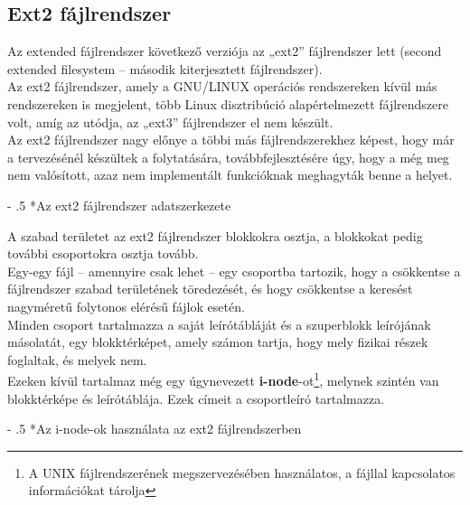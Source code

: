 \documentclass[tikz,12pt,margin=0px]{article}
\makeatletter
\renewcommand\paragraph{%
	\@startsection{paragraph}{4}{0mm}%
	{-\baselineskip}%
	{.5\baselineskip}%
	{\normalfont\normalsize\bfseries}}
\makeatother
\begin{document}
    \subsection*{Ext2 fájlrendszer}

    \noindent Az extended fájlrendszer következő verziója az „ext2” fájlrendszer lett (second extended filesystem – második kiterjesztett fájlrendszer).\\

    \noindent Az ext2 fájlrendszer, amely a GNU/LINUX operációs rendszereken kívül más rendszereken is megjelent, több Linux disztribúció alapértelmezett fájlrendszere volt, amíg az utódja, az „ext3” fájlrendszer  el nem készült.\\

    \noindent Az ext2 fájlrendszer nagy előnye a többi más fájlrendszerekhez képest, hogy már a tervezésénél készültek a folytatására, továbbfejlesztésére úgy, hogy a még meg nem valósított, azaz nem implementált funkcióknak meghagyták benne a helyet.

    \paragraph*{Az ext2 fájlrendszer adatszerkezete}

    \noindent A szabad területet az ext2 fájlrendszer blokkokra osztja, a blokkokat pedig további csoportokra osztja tovább. \\

    \noindent Egy-egy fájl – amennyire csak lehet – egy csoportba tartozik, hogy a csökkentse a fájlrendszer szabad területének töredezését, és hogy csökkentse a keresést nagyméretű folytonos elérésű fájlok esetén.\\

    \noindent Minden csoport tartalmazza a saját leírótábláját és a szuperblokk leírójának másolatát, egy blokktérképet, amely számon tartja, hogy mely fizikai részek foglaltak, és melyek nem.\\

    \noindent Ezeken kívül tartalmaz még egy úgynevezett \textbf{i-node}-ot\footnote{A UNIX fájlrendszerének megszervezésében használatos, a fájllal kapcsolatos információkat tárolja}, melynek szintén van blokktérképe és leírótáblája. Ezek címeit a csoportleíró tartalmazza.

    \paragraph*{Az i-node-ok használata az ext2 fájlrendszerben}
\end{document}
